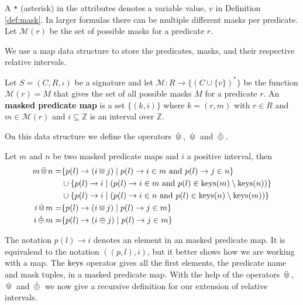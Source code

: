 A \texttt{*} (asterisk) in the attributes denotes a variable value, $v$ in Definition \ref{def:mask}.
In larger formulas there can be multiple different masks per predicate.
Let $\mathcal{M}(r)$ be the set of possible masks for a predicate $r$.

We use a map data structure to store the predicates, masks, and their respective relative intervals.

\begin{definition}
    \label{def:map}
    Let $S=(C,R,\iota)$ be a signature and let $\mathcal{M} : R \to \{(C \cup \{v\})^*\}$ be the function $\mathcal{M}(r) = M$ that gives the set of all possible masks $M$ for a predicate $r$.
    An \textbf{masked predicate map} is a set $\{(k,i)\}$ where $k = (r,m)$ with $r \in R$ and $m \in \mathcal{M}(r)$ and $i \subseteq \mathbb{Z}$ is an interval over $\mathbb{Z}$. 
\end{definition}


On this data structure we define the operators $\,\ddot{\Cup}\,$, $\,\dot{\Cup}\,$ and $\,\dot{\oplus}\,$.

\begin{definition}
    \label{def:e-rel-int-ops}
    Let $m$ and $n$ be two masked predicate maps and $i$ a positive interval, then 
    \begin{align*}
        m \,\ddot{\Cup}\, n = 
            & \{ p(l) \rightarrow (i \Cup j) \mid 
                p(l) \rightarrow i \in m \text{ and } 
                p(l) \rightarrow j \in n \} \\
            & \cup \{p(l) \rightarrow i \mid  
                (p(l) \rightarrow i \in m \text{ and }
                p(l) \in \operatorname{keys}(m) \setminus \operatorname{keys}(n)) \} \\
            & \cup \{p(l) \rightarrow i \mid  
                (p(l) \rightarrow i \in n \text{ and }
                p(l) \in \operatorname{keys}(n) \setminus \operatorname{keys}(m))
                \}        
                \\
        i \,\dot{\Cup}\, m = 
            & \{ p(l) \rightarrow (i \Cup j) \mid 
                p(l) \rightarrow j \in m \} \\
        i \,\dot{\oplus}\, m = 
            & \{ p(l) \rightarrow (i \oplus j) \mid 
                p(l) \rightarrow j \in m \} \\
    \end{align*}
\end{definition}

The notation $p(l) \rightarrow i$ denotes an element in an masked predicate map.
It is equivalend to the notation $((p,l), i)$, but it better shows how we are working with a map.
The $\operatorname{keys}$ operator gives all the first elements, the predicate name and mask tuples, in a masked predicate map.
With the help of the operators $\,\ddot{\Cup}\,$, $\,\dot{\Cup}\,$ and $\,\dot{\oplus}\,$ we now give a recursive definition for our extension of relative intervals.


